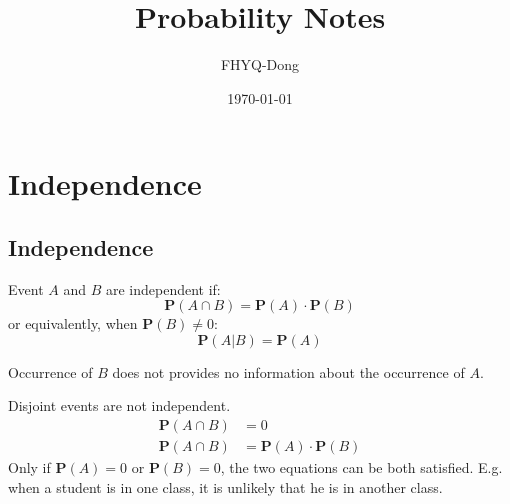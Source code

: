 \documentclass[device=normal, lang=en, fontsize=12pt]{elegantnote}
\title{Probability Notes}
\author{FHYQ-Dong}
\date{\today}
\numberwithin{equation}{section}
\begin{document}
\maketitle
\newpage
\tableofcontents
\newpage







\section{Independence}
\subsection{Independence}
\begin{definition}[Independence]
    Event $A$ and $B$ are independent if:
    \begin{equation}
        \mathbf{P}(A \cap B) = \mathbf{P}(A) \cdot \mathbf{P}(B)
    \end{equation}
    or equivalently, when $\mathbf{P}(B) \neq 0$:
    \begin{equation}
        \mathbf{P}(A|B) = \mathbf{P}(A)
    \end{equation}
\end{definition}
Occurrence of $B$ does not provides no information about the occurrence of $A$.
\begin{remark}
    Disjoint events are not independent.
    \begin{equation}
    \begin{aligned}
        \mathbf{P}(A \cap B) &= 0 \\
        \mathbf{P}(A \cap B) &= \mathbf{P}(A) \cdot \mathbf{P}(B)
    \end{aligned}
    \end{equation}
    Only if $\mathbf{P}(A) = 0$ or $\mathbf{P}(B) = 0$, the two equations can be both satisfied. E.g. when a student is in one class, it is unlikely that he is in another class.
\end{remark}
\end{document}
